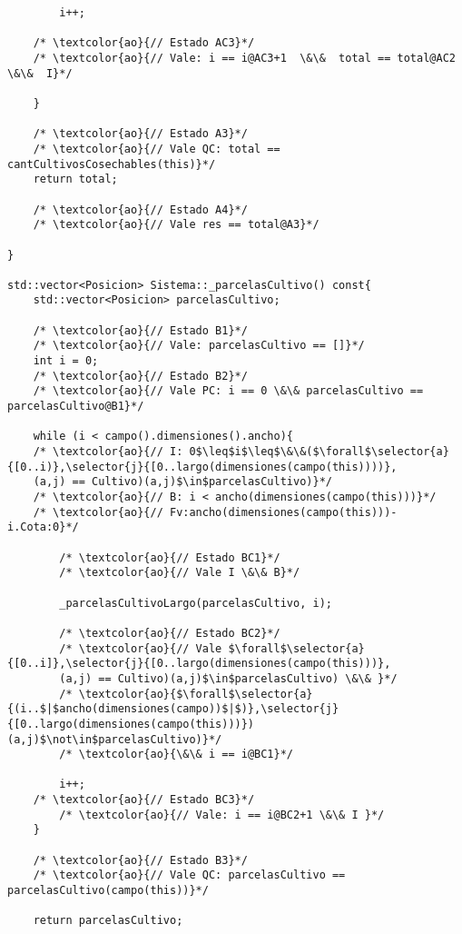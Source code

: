 \begin{lstlisting}
        i++;
    
    /* \textcolor{ao}{// Estado AC3}*/
    /* \textcolor{ao}{// Vale: i == i@AC3+1  \&\&  total == total@AC2 \&\&  I}*/
            
    }

    /* \textcolor{ao}{// Estado A3}*/	    
    /* \textcolor{ao}{// Vale QC: total == cantCultivosCosechables(this)}*/    
    return total;

    /* \textcolor{ao}{// Estado A4}*/    
    /* \textcolor{ao}{// Vale res == total@A3}*/    
    
}

std::vector<Posicion> Sistema::_parcelasCultivo() const{
    std::vector<Posicion> parcelasCultivo;

	/* \textcolor{ao}{// Estado B1}*/	    
    /* \textcolor{ao}{// Vale: parcelasCultivo == []}*/    
    int i = 0;
	/* \textcolor{ao}{// Estado B2}*/	    
    /* \textcolor{ao}{// Vale PC: i == 0 \&\& parcelasCultivo == parcelasCultivo@B1}*/    
        
    while (i < campo().dimensiones().ancho){ 
    /* \textcolor{ao}{// I: 0$\leq$i$\leq$\&\&($\forall$\selector{a}{[0..i)},\selector{j}{[0..largo(dimensiones(campo(this))))},
    (a,j) == Cultivo)(a,j)$\in$parcelasCultivo)}*/
    /* \textcolor{ao}{// B: i < ancho(dimensiones(campo(this)))}*/
    /* \textcolor{ao}{// Fv:ancho(dimensiones(campo(this)))-i.Cota:0}*/
    
    	/* \textcolor{ao}{// Estado BC1}*/   
    	/* \textcolor{ao}{// Vale I \&\& B}*/       	    
        
        _parcelasCultivoLargo(parcelasCultivo, i);

    	/* \textcolor{ao}{// Estado BC2}*/   
    	/* \textcolor{ao}{// Vale $\forall$\selector{a}{[0..i]},\selector{j}{[0..largo(dimensiones(campo(this)))},
    	(a,j) == Cultivo)(a,j)$\in$parcelasCultivo) \&\& }*/
    	/* \textcolor{ao}{$\forall$\selector{a}{(i..$|$ancho(dimensiones(campo))$|$)},\selector{j}{[0..largo(dimensiones(campo(this)))})(a,j)$\not\in$parcelasCultivo)}*/
    	/* \textcolor{ao}{\&\& i == i@BC1}*/

        i++;
	/* \textcolor{ao}{// Estado BC3}*/   
    	/* \textcolor{ao}{// Vale: i == i@BC2+1 \&\& I }*/        
    }
    
    /* \textcolor{ao}{// Estado B3}*/	    
    /* \textcolor{ao}{// Vale QC: parcelasCultivo == parcelasCultivo(campo(this))}*/    
    
    return parcelasCultivo;
    

\end{lstlisting}
